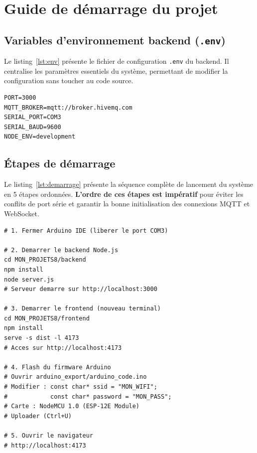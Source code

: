 \documentclass[12pt, a4paper]{report}
\begin{document}
\chapter{Guide de d\'emarrage du projet}

\section{Variables d'environnement backend (\texttt{.env})}

Le listing~\ref{lst:env} pr\'esente le fichier de configuration
\texttt{.env} du backend. Il centralise les param\`etres essentiels du
syst\`eme, permettant de modifier la configuration sans toucher au code
source.

\begin{lstlisting}[caption={Fichier .env du backend Node.js},
                  label={lst:env}]
PORT=3000
MQTT_BROKER=mqtt://broker.hivemq.com
SERIAL_PORT=COM3
SERIAL_BAUD=9600
NODE_ENV=development
\end{lstlisting}

\section{\'Etapes de d\'emarrage}

Le listing~\ref{lst:demarrage} pr\'esente la s\'equence compl\`ete de
lancement du syst\`eme en 5 \'etapes ordonn\'ees.
\textbf{L'ordre de ces \'etapes est imp\'eratif} pour \'eviter les
conflits de port s\'erie et garantir la bonne initialisation des
connexions MQTT et WebSocket.

\begin{lstlisting}[caption={S\'equence de lancement compl\`ete},
                  label={lst:demarrage}]
# 1. Fermer Arduino IDE (liberer le port COM3)

# 2. Demarrer le backend Node.js
cd MON_PROJETS8/backend
npm install
node server.js
# Serveur demarre sur http://localhost:3000

# 3. Demarrer le frontend (nouveau terminal)
cd MON_PROJETS8/frontend
npm install
serve -s dist -l 4173
# Acces sur http://localhost:4173

# 4. Flash du firmware Arduino
# Ouvrir arduino_export/arduino_code.ino
# Modifier : const char* ssid = "MON_WIFI";
#            const char* password = "MON_PASS";
# Carte : NodeMCU 1.0 (ESP-12E Module)
# Uploader (Ctrl+U)

# 5. Ouvrir le navigateur
# http://localhost:4173
\end{lstlisting}
\end{document}
